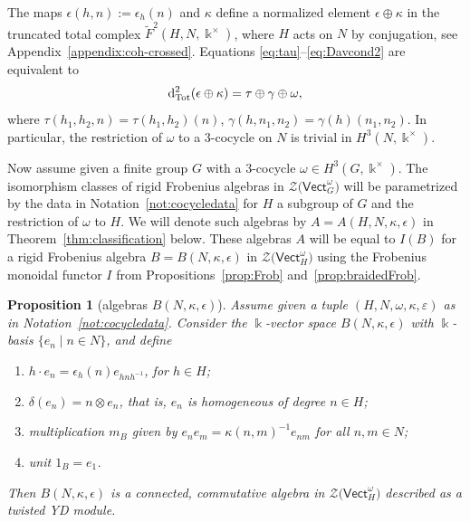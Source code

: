 \documentclass[10pt,a4paper]{amsart}
\numberwithin{equation}{section}
\newtheorem{Proposition}[Theorem]{Proposition}
 { \theoremstyle{definition}
\newtheorem{Definition}[Theorem]{Definition}
\newtheorem{Note}[Theorem]{Note}
\newtheorem{Notation}[Theorem]{Notation}
\newtheorem{Example}[Theorem]{Example}
\newtheorem{Remark}[Theorem]{Remark} }
\newcommand{\deri}{{\rm d}}
\newcommand{\wF}{\widetilde{F}}
\newcommand{\Tot}{\mathrm{Tot}}
\newcommand{\Vect}{\mathsf{Vect}}
\newcommand{\cZ}{\mathcal{Z}}
\newcommand{\rI}{I}
\begin{document}
\begin{Remark}\label{rem:Ntriv}
 The maps $\epsilon(h,n):=\epsilon_{h}(n)$ and $\kappa$ define a normalized element $\epsilon\oplus \kappa$ in the truncated total complex $\wF^2(H,N,\Bbbk^\times)$, where $H$ acts on $N$ by conjugation, see Appendix~\ref{appendix:coh-crossed}. Equations \eqref{eq:tau}--\eqref{eq:Davcond2} are equivalent to
 \begin{equation*}
 \deri_{\Tot}^2(\epsilon\oplus \kappa)=\tau\oplus \gamma \oplus \omega,
 \end{equation*}
 where $\tau(h_1,h_2,n)=\tau(h_1,h_2)(n)$, $\gamma(h,n_1,n_2)=\gamma(h)(n_1,n_2)$.
 In particular, the restriction of $\omega$ to a $3$-cocycle on $N$ is trivial in $H^3(N,\Bbbk^\times)$.
\end{Remark}

Now assume given a finite group $G$ with a $3$-cocycle $\omega\in H^3(G,\Bbbk^\times)$.
The isomorphism classes of rigid Frobenius algebras in $\cZ\big(\Vect_G^\omega\big)$ will be parametrized by the data in Notation~\ref{not:cocycledata} for $H$ a subgroup of $G$ and the restriction of $\omega$ to $H$. We will denote such algebras by $A=A(H,N,\kappa,\epsilon)$ in Theorem~\ref{thm:classification} below. These algebras $A$ will be equal to $\rI(B)$ for a rigid Frobenius algebra $B=B(N,\kappa,\epsilon)$ in $\cZ\big(\Vect_{H}^\omega\big)$ using the Frobenius monoidal functor $\rI$ from Propositions~\ref{prop:Frob} and~\ref{prop:braidedFrob}.

\begin{Proposition}[algebras $B(N,\kappa,\epsilon)$] \label{prop:B-algebra} Assume given a tuple $(H,N,\omega,\kappa,\varepsilon)$ as in Notation~{\rm \ref{not:cocycledata}}.
Consider the $\Bbbk$-vector space $B(N,\kappa, \epsilon)$ with $\Bbbk$-basis $\{ e_n \mid n\in N\}$, and define
 \begin{enumerate}\itemsep=0pt
 \item[$(i)$] $h \cdot e_n=\epsilon_h(n) e_{hnh^{-1}}$, for $h\in H$;
 \item[$(ii)$] $\delta(e_n)=n\otimes e_n$, that is, $e_n$ is homogeneous of degree $n\in H$;
 \item[$(iii)$] multiplication $m_B$ given by $e_n e_m = \kappa(n,m)^{-1} e_{nm}$ for all $ n,m\in N$;
 \item[$(iv)$] unit $1_B = e_{1}$.
 \end{enumerate}
 Then $B(N,\kappa, \epsilon)$ is a connected, commutative algebra in $\cZ\big(\Vect_H^\omega\big)$ described as a twisted YD module.
\end{Proposition}
\end{document}
